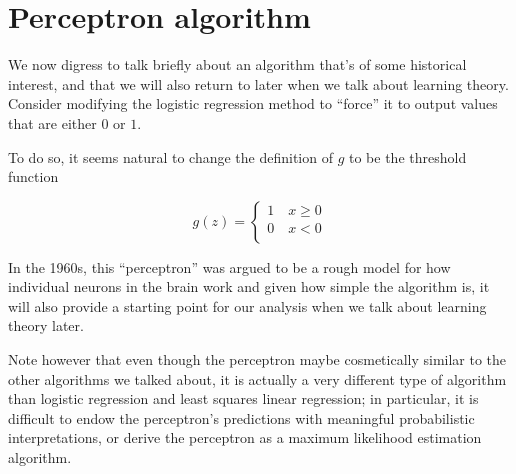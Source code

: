 \section{Perceptron algorithm}
We now digress to talk briefly about an algorithm that’s of some historical interest, 
and that we will also return to later when we talk about learning theory.\newline
Consider modifying the logistic regression method to “force” it to output values that are either $0$ or $1$.

To do so, it seems natural to change the definition of $g$ to be the threshold function

\[ g(z) = \begin{cases}
            1 \quad x \geq 0 \\
            0 \quad x < 0 \\
          \end{cases} \]

In the 1960s, this “perceptron” was argued to be a rough model for how individual neurons in the brain work and 
given how simple the algorithm is, it will also provide a starting point for our analysis when we talk
about learning theory later.

Note however that even though the perceptron maybe cosmetically similar to the other algorithms we talked about,
it is actually a very different type of algorithm than logistic regression and least squares linear regression;
in particular, it is difficult to endow the perceptron’s predictions with meaningful probabilistic interpretations,
or derive the perceptron as a maximum likelihood estimation algorithm.

